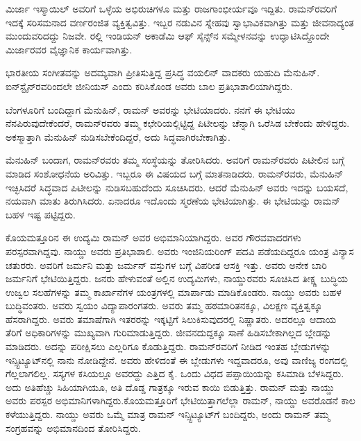 ಮಿರ್ಜಾ ಇಸ್ಮಾಯಿಲ್ ಅವರಿಗೆ ಒಳ್ಳೆಯ ಅಭಿರುಚಿಗಳೂ ಮತ್ತು ರಾಜಗಾಂಭೀರ್ಯವೂ ಇದ್ದಿತು. ರಾಮನ್‍ರವರಿಗೆ ಇದಕ್ಕೆ ಸರಿಸಮನಾದ ವರ್ಣರಂಜಿತ ವ್ಯಕ್ತಿತ್ವವಿತ್ತು. ಇಬ್ಬರ ನಡುವಿನ ಸ್ನೇಹವು ಸ್ವಾಭಾವಿಕವಾಗಿತ್ತು ಮತ್ತು ಜೀವನಾದ್ಯಂತ ಮುಂದುವರಿದದ್ದು ನಿಜವೇ. ರಲ್ಲಿ ಇಂಡಿಯನ್ ಅಕಾಡೆಮಿ ಆಫ್ ಸೈನ್ಸ್‌ನ ಸಮ್ಮೇಳನವನ್ನು ಉದ್ಘಾಟಿಸಿದ್ದೊಂದೇ ಮಿರ್ಜಾರವರ ವೈಜ್ಞಾನಿಕ ಕಾರ್ಯವಾಗಿತ್ತು.



ಭಾರತೀಯ ಸಂಗೀತವನ್ನು ಅದಮ್ಯವಾಗಿ ಪ್ರೀತಿಸುತ್ತಿದ್ದ ಪ್ರಸಿದ್ಧ ವಯಲಿನ್ ವಾದಕರು ಯಹುದಿ ಮೆನುಹಿನ್. ಐನ್‍ಸ್ಟೈನ್‍ರವರಿಂದಲೇ ಜೀನಿಯಸ್ ಎಂದು ಕರಿಸಿಕೊಂಡ ಅವರು ಬಾಲ ಪ್ರತಿಭಾಶಾಲಿಯಾಗಿದ್ದರು.

ಬೆಂಗಳೂರಿಗೆ ಬಂದಿದ್ದಾಗ ಮೆನುಹಿನ್, ರಾಮನ್ ಅವರನ್ನು ಭೇಟಿಯಾದರು. ನನಗೆ ಈ ಭೇಟಿಯು ನೆನಪಿರುವುದೇಕೆಂದರೆ, ರಾಮನ್‍ರವರು ತಮ್ಮ ಕಛೇರಿಯಲ್ಲಿಟ್ಟಿದ್ದ ಪಿಟೀಲನ್ನು ಚೆನ್ನಾಗಿ ಒರೆಸಿಡ ಬೇಕೆಂದು ಹೇಳಿದ್ದರು. ಅಕಸ್ಮಾತ್ತಾಗಿ ಮೆನುಹಿನ್ ನುಡಿಸಬೇಕೆಂದಿದ್ದರೆ, ಅದು ಸಿದ್ಧವಾಗಿರಬೇಕಾಗಿತ್ತು.

ಮೆನುಹಿನ್ ಬಂದಾಗ, ರಾಮನ್‍ರವರು ತಮ್ಮ ಸಂಸ್ಥೆಯನ್ನು ತೋರಿಸಿದರು. ಅವರಿಗೆ ರಾಮನ್‍ರವರು ಪಿಟೀಲಿನ ಬಗ್ಗೆ ಮಾಡಿದ ಸಂಶೋಧನೆಯ ಅರಿವಿತ್ತು. ಇಬ್ಬರೂ ಈ ವಿಷಯದ ಬಗ್ಗೆ ಮಾತನಾಡಿದರು. ರಾಮನ್‍ರವರು, ಮೆನುಹಿನ್ ಇಚ್ಛಿಸಿದರೆ ಸಿದ್ಧವಾದ ಪಿಟೀಲನ್ನು ನುಡಿಸಬಹುದೆಂದು ಸೂಚಿಸಿದರು. ಆದರೆ ಮೆನುಹಿನ್ ಅವರು ಇದನ್ನು ಬಯಸದೆ, ನಯವಾಗಿ ಮಾತು ತಿರುಗಿಸಿದರು. ಏನಾದರೂ ಇದೊಂದು ಸ್ಮರಣೆಯ ಭೇಟಿಯಾಗಿತ್ತು. ಈ ಭೇಟಿಯನ್ನು ರಾಮನ್ ಬಹಳ ಇಷ್ಟ ಪಟ್ಟಿದ್ದರು.



ಕೊಯಮತ್ತೂರಿನ ಈ ಉದ್ಯಮಿ ರಾಮನ್ ಅವರ ಅಭಿಮಾನಿಯಾಗಿದ್ದರು. ಅವರ ಗೌರವವಾದರಗಳು ಪರಸ್ಪರವಾಗಿದ್ದವು. ನಾಯ್ಡು ಅವರು ಪ್ರತಿಭಾಶಾಲಿ. ಅವರು ಇಂಜಿನಿಯರಿಂಗ್ ಪದವಿ ಪಡೆಯದಿದ್ದರೂ ಯಂತ್ರ ವಿನ್ಯಾಸ ಚತುರರು. ಅವರಿಗೆ ಜರ್ಮನಿ ಮತ್ತು ಜರ್ಮನ್ ವಸ್ತುಗಳ ಬಗ್ಗೆ ವಿಪರೀತ ಆಸಕ್ತಿ ಇತ್ತು. ಅವರು ಅನೇಕ ಬಾರಿ ಜರ್ಮನಿಗೆ ಭೇಟಿಯಿತ್ತಿದ್ದರು. ಜನರು ಹೇಳುವಂತೆ ಅಲ್ಲಿನ ಉದ್ಯಮಿಗಳು, ನಾಯ್ಡುರವರು ಸೂಚಿಸಿದ ತೀಕ್ಷ್ಣ ಬುದ್ಧಿಯ ಉಜ್ವಲ ಸಲಹೆಗಳನ್ನು ತಮ್ಮ ಕಾರ್ಖಾನೆಗಳ ಯಂತ್ರಗಳಲ್ಲಿ ಮಾರ್ಪಾಡು ಮಾಡಿಕೊಂಡರು. ನಾಯ್ಡು ಅವರು ಬಹಳ ಬುದ್ಧಿವಂತರು. ಅವರು ಸ್ವಯಂ ವಿದ್ಯಾಪಾರಂಗತರು. ಅವರು ತಮ್ಮ ಹಠಮಾರಿತನಕ್ಕೂ, ವಿಲಕ್ಷಣ ವ್ಯಕ್ತಿತ್ವಕ್ಕೂ ಹೆಸರಾಗಿದ್ದರು. ಅವರು ತಮಾಷೆಗಾಗಿ ಇತರರನ್ನು ಇಕ್ಕಟ್ಟಿಗೆ ಸಿಲುಕಿಸುವುದರಲ್ಲಿ ನಿಷ್ಣಾತರು. ಅದರಲ್ಲೂ ಆದಾಯ ತೆರಿಗೆ ಅಧಿಕಾರಿಗಳನ್ನು ಮುಖ್ಯವಾಗಿ ಗುರಿಮಾಡುತ್ತಿದ್ದರು. ಜೀವನದುದ್ದಕ್ಕೂ ಸಾಣೆ ಹಿಡಿಸಬೇಕಾಗಿಲ್ಲದ ಬ್ಲೇಡನ್ನು ಮಾಡಿದರು. ಅದನ್ನು ಪರೀಕ್ಷಿಸಲು ಎಲ್ಲರಿಗೂ ಕೊಡುತ್ತಿದ್ದರು. ರಾಮನ್‍ರವರಿಗೆ ನೀಡಿದ ಇಂತಹ ಬ್ಲೇಡುಗಳನ್ನು ಇನ್ಸ್ಟಿಟ್ಯೂಟ್‍ನಲ್ಲಿ ನಾನು ನೋಡಿದ್ದೇನೆ. ಅವರು ಹೇಳಿದಂತೆ ಈ ಬ್ಲೇಡುಗಳು ಇದ್ದವಾದರೂ, ಅವು ವಾಣಿಜ್ಯ ರಂಗದಲ್ಲಿ ಗೆಲ್ಲಲಾಗಲಿಲ್ಲ. ಸಸ್ಯಗಳ ಕಸಿಯಲ್ಲೂ ಅವರದ್ದು ಎತ್ತಿದ ಕೈ. ಒಂದು ವಿಧದ ಪಪ್ಪಾಯಿಯನ್ನು ಕಸಿಮಾಡಿ ಬೆಳಸಿದ್ದರು. ಅದು ಅತಿಹೆಚ್ಚು ಸಿಹಿಯಾಗಿಯೂ, ಅತಿ ದೊಡ್ಡ ಗಾತ್ರಕ್ಕೂ ಇರುವ ಕಾಯಿ ಬಿಡುತ್ತಿತ್ತು. ರಾಮನ್ ಮತ್ತು ನಾಯ್ಡು ಅವರು ಪರಸ್ಪರ ಅಭಿಮಾನಿಗಳಾಗಿದ್ದರು.\break ಕೊಯಮತ್ತೂರಿಗೆ ಭೇಟಿಯಿತ್ತಾಗಲೆಲ್ಲಾ ರಾಮನ್, ನಾಯ್ಡು ಅವರೊಡನೆ ಕಾಲ ಕಳೆಯುತ್ತಿದ್ದರು. ನಾಯ್ಡು ಅವರು ಒಮ್ಮೆ ಮಾತ್ರ ರಾಮನ್ ಇನ್ಸ್ಟಿಟ್ಯೂಟ್‍ಗೆ ಬಂದಿದ್ದರು, ಅಂದು ರಾಮನ್ ತಮ್ಮ ಸಂಗ್ರಹವನ್ನು ಅಭಿಮಾನದಿಂದ ತೋರಿಸಿದ್ದರು.

